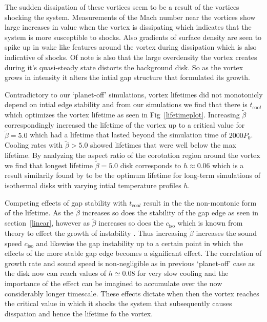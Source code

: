 The sudden dissipation of these vortices seem to be a result of the vortices shocking the system. Measurements of the Mach number near the vortices show large increases in value when the vortex is dissipating which indicates that the system is more susceptible to shocks. Also gradients of surface density are seen to spike up in wake like features around the vortex during dissipation which is also indicative of shocks. Of note is also that the large overdensity the vortex creates during it's quasi-steady state distorts the background disk. So as the vortex grows in intensity it alters the intial gap structure that formulated its growth.

Contradictory to our `planet-off' simulations, vortex lifetimes did not monotonicly depend on intial edge stability and from our simulations we find that there is $t_{\mathrm{coo}l}$ which optimizes the vortex lifetime as seen in Fig~\ref{lifetimeplot}. Increasing $\tilde\beta$ correspondingly increased the lifetime of the vortex up to a critical value for $\tilde{\beta}=5.0$ which had a lifetime that lasted beyond the simulation time of $2000P_0$. Cooling rates with $\tilde\beta>5.0$ showed lifetimes that were well below the max lifetime. By analyzing the aspect ratio of the corotation region around the vortex we find that longest lifetime $\tilde\beta=5.0$ disk corresponds to $h\approx0.06$ which is a result similarily found by \citet{fu14} to be the optimum lifetime for long-term simulations of isothermal disks with varying intial temperature profiles $h$.

Competing effects of gap stability with $t_{\mathrm{coo}l}$ result in the the non-montonic form of the lifetime. As the $\tilde\beta$ increases so does the stability of the gap edge as seen in section~\ref{linear}, however as $\tilde\beta$ increases so does the $c_{\mathrm{iso}}$ which is known from theory to effect the growth of instability \citep{li00}. Thus increasing $\tilde\beta$ increases the sound speed $c_{\mathrm{iso}}$ and likewise the gap instability up to a certain point in which the effects of the more stable gap edge becomes a significant effect. The correlation of growth rate and sound speed is non-negligible as in previous `planet-off' case as the disk now can reach values of $h\simeq0.08$ for very slow cooling and the importance of the effect can be imagined to accumulate over the now considerably longer timescale. These effects dictate when then the vortex reaches the critical value in which it shocks the system that subsequently causes disspation and hence the lifetime fo the vortex.

